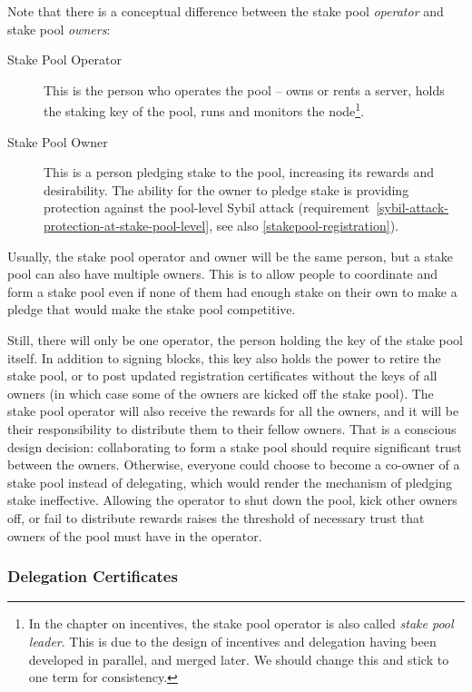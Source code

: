 \documentclass[11pt,a4paper]{article}
\begin{document}
Note that there is a conceptual difference between the stake pool
\emph{operator} and stake pool \emph{owners}:
\begin{description}
\item[Stake Pool Operator] This is the person who operates the pool -- owns or
  rents a server, holds the staking key of the pool, runs and monitors the
  node\footnote{In the chapter on incentives, the stake pool operator is also
    called \emph{stake pool leader}. This is due to the design of incentives and
    delegation having been developed in parallel, and merged later. We should
    change this and stick to one term for consistency.}.
\item[Stake Pool Owner] This is a person pledging stake
  to the pool, increasing its rewards and desirability. The ability
  for the owner to pledge stake is providing protection against the
  pool-level Sybil attack
  (requirement~\ref{sybil-attack-protection-at-stake-pool-level}, see
  also \cref{stakepool-registration}).
\end{description}

Usually, the stake pool operator and owner will be the same person,
but a stake pool can also have multiple owners. This is to allow
people to coordinate and form a stake pool even if none of them had
enough stake on their own to make a pledge that would make the stake
pool competitive.

Still, there will only be one operator, the person holding the key of the stake
pool itself. In addition to signing blocks, this key also holds the power to
retire the stake pool, or to post updated registration certificates without the
keys of all owners (in which case some of the owners are kicked off the stake
pool). The stake pool operator will also receive the rewards for all the owners,
and it will be their responsibility to distribute them to their fellow owners.
That is a conscious design decision: collaborating to form a stake pool should
require significant trust between the owners. Otherwise, everyone could choose
to become a co-owner of a stake pool instead of delegating, which would render
the mechanism of pledging stake ineffective. Allowing the operator to shut down
the pool, kick other owners off, or fail to distribute rewards raises the
threshold of necessary trust that owners of the pool must have in the operator.

\subsubsection{Delegation Certificates}
\label{delegation-certificates}
\end{document}

